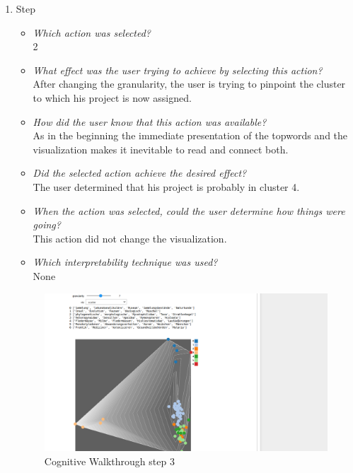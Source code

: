{\begin{enumerate}
		\item Step
		\begin{itemize}
			\item \textit{Which action was selected?} \\
			2
			\item \textit{What effect was the user trying to achieve by selecting this action?} \\
			After changing the granularity, the user is trying to pinpoint the cluster to which his project is now assigned. 
			\item \textit{How did the user know that this action was available?} \\
			As in the beginning the immediate presentation of the topwords and the visualization makes it inevitable to read and connect both. 
			\item \textit{Did the selected action achieve the desired effect?} \\
			The user determined that his project is probably in cluster 4. 
			\item \textit{When the action was selected, could the user determine how things were going?} \\
			This action did not change the visualization.
			\item \textit{Which interpretability technique was used?}\\
			None
		\end{itemize}
		\begin{figure}[H]
			\centering
			\includegraphics[width=400px]{../chapters/validation/pics/2_c}
			\caption{\label{pic:step3} Cognitive Walkthrough step 3}
		\end{figure} \newpage
		

\end{enumerate}}
